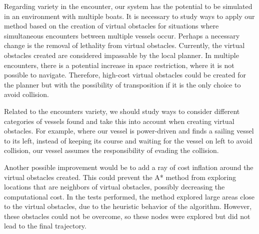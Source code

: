     Regarding variety in the encounter, our system has the potential to be simulated in an environment with multiple boats. It is necessary to study ways to apply our method based on the creation of virtual obstacles for situations where simultaneous encounters between multiple vessels occur. Perhaps a necessary change is the removal of lethality from virtual obstacles. Currently, the virtual obstacles created are considered impassable by the local planner. In multiple encounters, there is a potential increase in space restriction, where it is not possible to navigate. Therefore, high-cost virtual obstacles could be created for the planner but with the possibility of transposition if it is the only choice to avoid collision.
    
    Related to the encounters variety, we should study ways to consider different categories of vessels found and take this into account when creating virtual obstacles. For example, where our vessel is power-driven and finds a sailing vessel to its left, instead of keeping its course and waiting for the vessel on left to avoid collision, our vessel assumes the responsibility of evading the collision.
    
    Another possible improvement would be to add a ray of cost inflation around the virtual obstacles created. This could prevent the A* method from exploring locations that are neighbors of virtual obstacles, possibly decreasing the computational cost. In the tests performed, the method explored large areas close to the virtual obstacles, due to the heuristic behavior of the algorithm. However, these obstacles could not be overcome, so these nodes were explored but did not lead to the final trajectory.